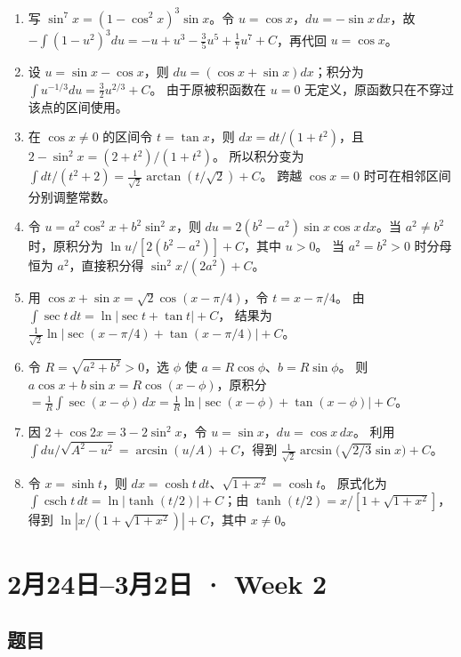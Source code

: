 \documentclass[UTF8,11pt, a4paper, oneside, fontset=none]{ctexbook}
\begin{document}
\begin{enumerate}
定义 $C_c(x)=\sin(cx)/c$（$c\ne0$）、$C_0(x)=x$，
逐项积分得到 $\tfrac12[C_{a-b}(x)-C_{a+b}(x)]+C$。
\item 写 $\sin^7x=(1-\cos^2x)^3\sin x$。令 $u=\cos x$，$du=-\sin x\,dx$，故
$-\int(1-u^2)^3du=-u+u^3-\frac35u^5+\frac17u^7+C$，再代回 $u=\cos x$。
\item 设 $u=\sin x-\cos x$，则 $du=(\cos x+\sin x)dx$；积分为
$\int u^{-1/3}du=\frac32u^{2/3}+C$。
由于原被积函数在 $u=0$ 无定义，原函数只在不穿过该点的区间使用。
\item 在 $\cos x\ne0$ 的区间令 $t=\tan x$，则
$dx=dt/(1+t^2)$，且 $2-\sin^2x=(2+t^2)/(1+t^2)$。
所以积分变为 $\int dt/(t^2+2)=\frac1{\sqrt2}\arctan(t/\sqrt2)+C$。
跨越 $\cos x=0$ 时可在相邻区间分别调整常数。
\item 令 $u=a^2\cos^2x+b^2\sin^2x$，则
$du=2(b^2-a^2)\sin x\cos x\,dx$。当 $a^2\ne b^2$ 时，原积分为
$\ln u/[2(b^2-a^2)]+C$，其中 $u>0$。
当 $a^2=b^2>0$ 时分母恒为 $a^2$，直接积分得 $\sin^2x/(2a^2)+C$。
\item 用 $\cos x+\sin x=\sqrt2\cos(x-\pi/4)$，令 $t=x-\pi/4$。
由 $\int\sec t\,dt=\ln|\sec t+\tan t|+C$，
结果为 $\frac1{\sqrt2}\ln|\sec(x-\pi/4)+\tan(x-\pi/4)|+C$。
\item 令 $R=\sqrt{a^2+b^2}>0$，选 $\phi$ 使 $a=R\cos\phi$、$b=R\sin\phi$。
则 $a\cos x+b\sin x=R\cos(x-\phi)$，原积分
$=\frac1R\int\sec(x-\phi)\,dx
=\frac1R\ln|\sec(x-\phi)+\tan(x-\phi)|+C$。
\item 因 $2+\cos2x=3-2\sin^2x$，令 $u=\sin x$，$du=\cos x\,dx$。
利用 $\int du/\sqrt{A^2-u^2}=\arcsin(u/A)+C$，得到
$\frac1{\sqrt2}\arcsin\!\bigl(\sqrt{2/3}\sin x\bigr)+C$。
\item 令 $x=\sinh t$，则 $dx=\cosh t\,dt$、$\sqrt{1+x^2}=\cosh t$。
原式化为 $\int\operatorname{csch}t\,dt
=\ln|\tanh(t/2)|+C$；由 $\tanh(t/2)=x/[1+\sqrt{1+x^2}]$，
得到 $\ln|x/(1+\sqrt{1+x^2})|+C$，其中 $x\ne0$。
\end{enumerate}

\clearpage

\section{2月24日--3月2日 · Week 2}

\subsection*{题目}
\end{document}
